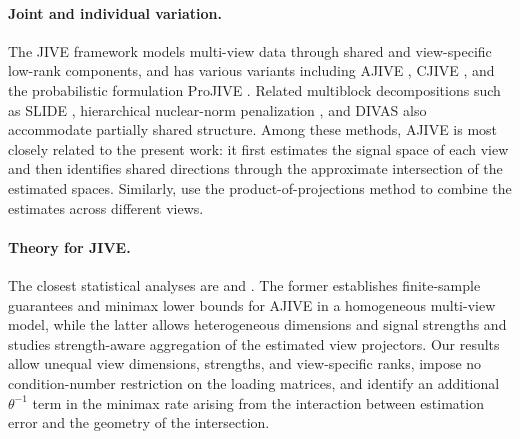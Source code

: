 \documentclass[11pt]{article}
\begin{document}
\paragraph{Joint and individual variation.}

The JIVE framework \citep{lock2013joint, zhou2015group} models multi-view data
through shared and view-specific low-rank components,
and has various variants including AJIVE \citep{Feng2018}, CJIVE
\citep{murden2022interpretive}, and the probabilistic formulation ProJIVE
\citep{murden2026projive}.
Related multiblock decompositions such as SLIDE \citep{gaynanova2019structural}, hierarchical nuclear-norm
penalization \citep{yi2023hierarchical}, and DIVAS
\citep{prothero2024data} also accommodate partially shared structure.
Among these methods, AJIVE is most closely related to the present work: it
first estimates the signal space of each view and then identifies shared
directions through the approximate intersection of the estimated spaces.
Similarly, \citet{sergazinov2026spectral} use the product-of-projections method to combine the estimates across different views.


\paragraph{Theory for JIVE.}
The closest statistical analyses are
\citet{yang2025estimating} and \citet{li2025heterojive}.
The former establishes finite-sample guarantees and minimax lower bounds for
AJIVE in a homogeneous multi-view model, while the latter allows heterogeneous
dimensions and signal strengths and studies strength-aware aggregation of the
estimated view projectors.
Our results allow unequal view dimensions, strengths, and view-specific ranks,
impose no condition-number restriction on the loading matrices, and identify
an additional $\theta^{-1}$ term in the minimax rate arising from the
interaction between estimation error and the geometry of the intersection.
\end{document}
